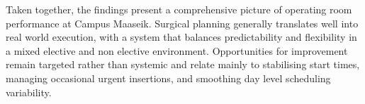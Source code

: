 \documentclass[
]{article}
\begin{document}
Taken together, the findings present a comprehensive picture of
operating room performance at Campus Maaseik. Surgical planning
generally translates well into real world execution, with a system that
balances predictability and flexibility in a mixed elective and non
elective environment. Opportunities for improvement remain targeted
rather than systemic and relate mainly to stabilising start times,
managing occasional urgent insertions, and smoothing day level
scheduling variability.
\end{document}
